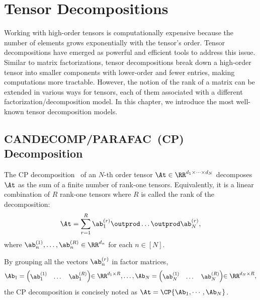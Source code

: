 \section{Tensor Decompositions}\label{chapter:tensor-decomposition}
Working with high-order tensors is computationally expensive because the number of elements grows exponentially with the tensor's order. Tensor decompositions have emerged as powerful and efficient tools to address this issue.
Similar to matrix factorizations, tensor decompositions break down a high-order tensor into smaller components with lower-order and fewer entries, making computations more tractable. However, the notion of the rank of a matrix can be extended in various ways for tensors, each of them associated with a different factorization/decomposition model.
In this chapter, we introduce the most well-known tensor decomposition models.
\subsection{CANDECOMP/PARAFAC~(CP) Decomposition}\label{sec:cp-decomposition}
The CP decomposition~\citep{hitchcock1927expression} of an $N$-th order tensor $\At\in\RR^{d_1\times\cdots\times d_N}$  decomposes $\At$ as the sum of a finite number of rank-one tensors. Equivalently, it is a linear combination of $R$ rank-one tensors where $R$ is called the  rank of the decomposition: 
$$\At = \sum_{r=1}^R \ab^{(r)}_1\outprod\dots\outprod\ab^{(r)}_N ,$$
where $\ab^{(1)}_n,\dots,\ab^{(R)}_n\in\RR^{d_n}$ for each $n\in [N]$.

By grouping all the vectors $\ab^{(r)}_n$ in factor matrices,
\[\Ab_1 = {\begin{pmatrix}
\ab^{(1)}_1 & \dots & \ab^{(R)}_1 \\
\end{pmatrix}}{\in\RR^{d_1\times R}}, \dots ,\Ab_N = {\begin{pmatrix}
\ab^{(1)}_N & \dots & \ab^{(R)}_N \\
\end{pmatrix}}{\in\RR^{d_N\times R}}, \]
the CP decomposition is concisely noted as $\At = \CP{\Ab_1,\cdots,\Ab_N}$.

